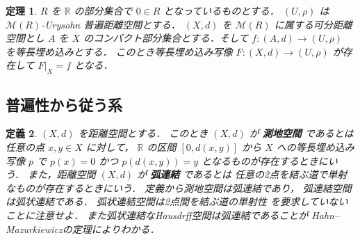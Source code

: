 \documentclass[leqno, 12pt]{jsarticle}
\newtheorem{thm}{定理}[section]
\newtheorem{df}[thm]{定義}
\newcommand{\rr}{\mathbb{R}}
\begin{document}
\begin{thm}\label{thm:pp:cptuniv}
$R$
を
$\rr$
の部分集合で
$0\in R$
となっているものとする．
$(U, \rho)$
は
$\mathscr{M}(R)$-Urysohn
普遍距離空間とする．
$(X, d)$
を
$\mathscr{M}(R)$
に属する可分距離空間とし
$A$
を
$X$
のコンパクト部分集合とする．そして
$f\colon  (A, d)\to (U, \rho)$
を等長埋め込みとする．
このとき等長埋め込み写像
$F\colon  (X, d)\to (U, \rho)$
が存在して
$F|_{X}=f$
となる．
\end{thm}

\subsection{普遍性から従う系}


\begin{df}\label{df:pp:lengthspace}
$(X, d)$
を距離空間とする．
このとき
$(X, d)$
が
\textbf{測地空間}
であるとは
任意の点
$x, y\in X$
に対して，
$\rr$
の区間
$[0, d(x, y)]$
から
$X$
への等長埋め込み写像
$p$
で
$p(x)=0$
かつ
$p(d(x, y))=y$
となるものが存在するときにいう．
また，距離空間
$(X, d)$
が
\textbf{弧連結}
であるとは
任意の2点を結ぶ道で単射なものが存在するときにいう．
定義から測地空間は弧連結であり，
弧連結空間は弧状連結である．
弧状連結空間は2点間を結ぶ道の単射性
を要求していないことに注意せよ．
また弧状連結なHausdrff空間は弧連結であることが
Hahn--Mazurkiewiczの定理によりわかる．
\end{df}





\end{document}
